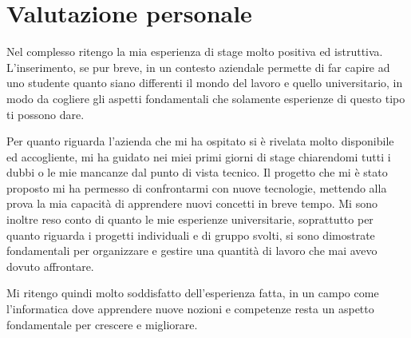 \section{Valutazione personale}
Nel complesso ritengo la mia esperienza di stage molto positiva ed istruttiva. L'inserimento, se pur breve, in un contesto aziendale permette di far capire ad uno studente quanto siano differenti il mondo del lavoro e quello universitario, in modo da cogliere gli aspetti fondamentali che solamente esperienze di questo tipo ti possono dare.

Per quanto riguarda l'azienda che mi ha ospitato si è rivelata molto disponibile ed accogliente, mi ha guidato nei miei primi giorni di stage chiarendomi tutti i dubbi o le mie mancanze dal punto di vista tecnico. Il progetto che mi è stato proposto mi ha permesso di confrontarmi con nuove tecnologie, mettendo alla prova la mia capacità di apprendere nuovi concetti in breve tempo. Mi sono inoltre reso conto di quanto le mie esperienze universitarie, soprattutto per quanto riguarda i progetti individuali e di gruppo svolti, si sono dimostrate fondamentali per organizzare e gestire una quantità di lavoro che mai avevo dovuto affrontare.

Mi ritengo quindi molto soddisfatto dell'esperienza fatta, in un campo come l'informatica dove apprendere nuove nozioni e competenze resta un aspetto fondamentale per crescere e migliorare. 
